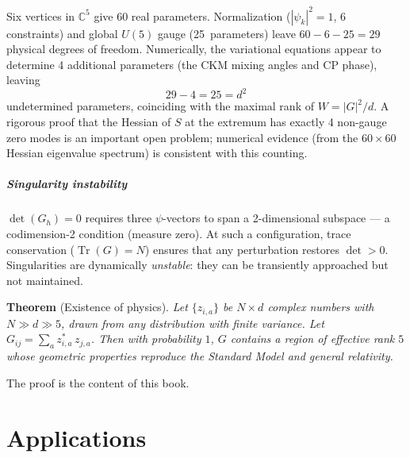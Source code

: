\documentclass[12pt]{article}
\theoremstyle{remark}
\theoremstyle{definition}
\begin{document}
Six vertices in $\mathbb{C}^5$ give $60$ real parameters.  Normalization ($|{\psi_k}|^2 = 1$, 6 constraints) and global $U(5)$ gauge (25~parameters) leave $60 - 6 - 25 = 29$ physical degrees of freedom.  Numerically, the variational equations appear to determine 4 additional parameters (the CKM mixing angles and CP phase), leaving
\begin{equation}
29 - 4 = 25 = d^2
\end{equation}
undetermined parameters, coinciding with the maximal rank of $W = |G|^2/d$.  A rigorous proof that the Hessian of $S$ at the extremum has exactly 4 non-gauge zero modes is an important open problem; numerical evidence (from the $60\times60$ Hessian eigenvalue spectrum) is consistent with this counting.

\subsubsection{Singularity instability}

$\det(G_h) = 0$ requires three $\psi$-vectors to span a 2-dimensional subspace --- a codimension-2 condition (measure zero).  At such a configuration, trace conservation ($\operatorname{Tr}(G) = N$) ensures that any perturbation restores $\det > 0$.  Singularities are dynamically \emph{unstable}: they can be transiently approached but not maintained.

\bigskip

\noindent\textbf{Theorem} (Existence of physics). \emph{Let $\{z_{i,a}\}$ be $N \times d$ complex numbers with $N \gg d \gg 5$, drawn from any distribution with finite variance. Let $G_{ij} = \sum_a z^*_{i,a}\,z_{j,a}$. Then with probability $1$, $G$ contains a region of effective rank $5$ whose geometric properties reproduce the Standard Model and general relativity.}

\bigskip

\noindent The proof is the content of this book.


\part{Applications}


\end{document}
